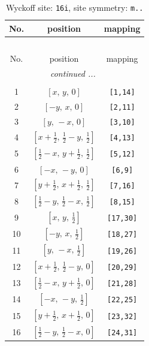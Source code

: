 \documentclass[fleqn,8pt]{jsarticle}
\begin{document}
\begin{longtable}{ccc}
\caption{Wyckoff site: {\tt 16i}, site symmetry: {\tt m..}}
 \\
 \hline \hline
No. & position & mapping \\ \hline \endfirsthead

\multicolumn{2}{l}{\tablename\ \thetable{}} \\
 \hline \hline
No. & position & mapping \\ \hline \endhead

 \hline \hline
\multicolumn{2}{r}{\footnotesize\it continued ...} \\ \endfoot

 \hline \hline
\multicolumn{2}{r}{} \\ \endlastfoot

1 & $\left[ x,\, y,\, 0 \right]$ & {\tt [1,14]} \\ \hline
2 & $\left[ - y,\, x,\, 0 \right]$ & {\tt [2,11]} \\ \hline
3 & $\left[ y,\, - x,\, 0 \right]$ & {\tt [3,10]} \\ \hline
4 & $\left[ x + \frac{1}{2},\, \frac{1}{2} - y,\, \frac{1}{2} \right]$ & {\tt [4,13]} \\ \hline
5 & $\left[ \frac{1}{2} - x,\, y + \frac{1}{2},\, \frac{1}{2} \right]$ & {\tt [5,12]} \\ \hline
6 & $\left[ - x,\, - y,\, 0 \right]$ & {\tt [6,9]} \\ \hline
7 & $\left[ y + \frac{1}{2},\, x + \frac{1}{2},\, \frac{1}{2} \right]$ & {\tt [7,16]} \\ \hline
8 & $\left[ \frac{1}{2} - y,\, \frac{1}{2} - x,\, \frac{1}{2} \right]$ & {\tt [8,15]} \\ \hline
9 & $\left[ x,\, y,\, \frac{1}{2} \right]$ & {\tt [17,30]} \\ \hline
10 & $\left[ - y,\, x,\, \frac{1}{2} \right]$ & {\tt [18,27]} \\ \hline
11 & $\left[ y,\, - x,\, \frac{1}{2} \right]$ & {\tt [19,26]} \\ \hline
12 & $\left[ x + \frac{1}{2},\, \frac{1}{2} - y,\, 0 \right]$ & {\tt [20,29]} \\ \hline
13 & $\left[ \frac{1}{2} - x,\, y + \frac{1}{2},\, 0 \right]$ & {\tt [21,28]} \\ \hline
14 & $\left[ - x,\, - y,\, \frac{1}{2} \right]$ & {\tt [22,25]} \\ \hline
15 & $\left[ y + \frac{1}{2},\, x + \frac{1}{2},\, 0 \right]$ & {\tt [23,32]} \\ \hline
16 & $\left[ \frac{1}{2} - y,\, \frac{1}{2} - x,\, 0 \right]$ & {\tt [24,31]} \\
\end{longtable}
\end{document}
